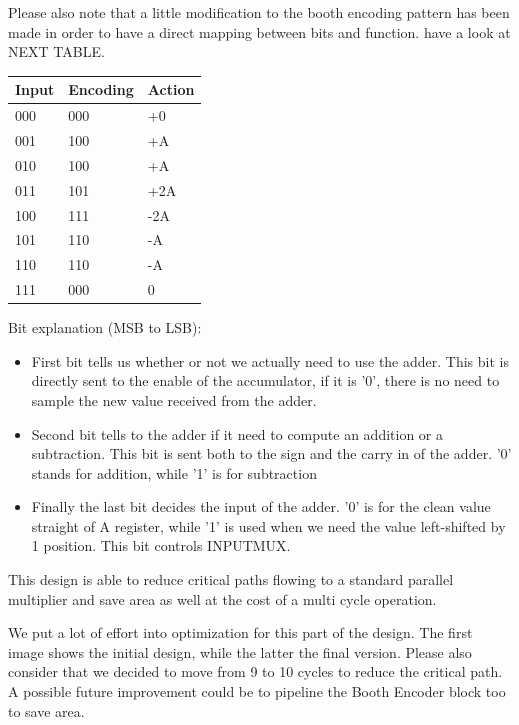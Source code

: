\documentclass[12pt]{article}
\begin{document}
Please also note that a little modification to the booth encoding pattern has been made in order to have a direct mapping between bits and function. have a look at NEXT TABLE.
\begin{center}
	\begin{tabular}{ | l | l | l |}
		\hline
		Input & Encoding & Action \\ \hline
		000 & 000 & +0 \\ \hline
		001 & 100 & +A \\ \hline
		010 & 100 & +A \\ \hline
		011 & 101 & +2A \\ \hline
		100 & 111 & -2A \\ \hline
		101 & 110 & -A \\ \hline
		110 & 110 & -A \\ \hline
		111 & 000 & 0 \\ \hline
		
	\end{tabular}
\end{center}

Bit explanation (MSB to LSB):
\begin{itemize}
	\item First bit tells us whether or not we actually need to use the adder. This bit is directly sent to the enable of the accumulator, if it is '0', there is no need to sample the new value received from the adder.
	\item Second bit tells to the adder if it need to compute an addition or a subtraction. This bit is sent both to the sign and the carry in of the adder. '0' stands for addition, while '1' is for subtraction
	\item Finally the last bit decides the input of the adder. '0' is for the clean value straight of A register, while '1' is used when we need the value left-shifted by 1 position. This bit controls INPUTMUX.
\end{itemize}

This design is able to reduce critical paths flowing to a standard parallel multiplier and save area as well at the cost of a multi cycle operation. 

We put a lot of effort into optimization for this part of the design. The first image shows the initial design, while the latter the final version. Please also consider that we decided to move from 9 to 10 cycles to reduce the critical path.
A possible future improvement could be to pipeline the Booth Encoder block too to save area.
\end{document}
